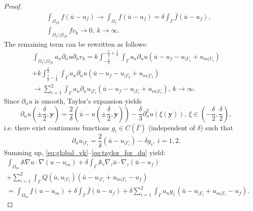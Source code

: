 \documentclass[a4paper]{article}
\def\vc#1{\mathbf{\boldsymbol{#1}}}     %
\def\tn#1{{\mathbb{#1}}}    %
\begin{document}
\begin{proof}
\begin{align}
&\int_{\Omega_{fk}} f (\bar u-u_f) \to \int_{\Omega_{f}} f (\bar u-u_f) = \delta\int_{\Gamma} \bar f (\bar u-u_f), \\
&\int_{\Omega_f\setminus\Omega_{fk}} f v_k \to 0,~k\to\infty.
\end{align}
The remaining term can be rewritten as follows:
\begin{multline}
\int_{\Omega_f\setminus\Omega_{fk}} a_n\partial_n u \partial_n v_k
= k\int_{-\frac\delta2}^{-\frac\delta2+\frac1k}\int_\Gamma a_n\partial_n u (\bar u - u_f - u_{|\Gamma_1} + u_{m|\Gamma_1})\\
+ k\int_{\frac\delta2-\frac1k}^{\frac\delta2}\int_\Gamma a_n\partial_n u (\bar u - u_f - u_{|\Gamma_2} + u_{m|\Gamma_2})\\
\to \sum_{i=1}^2\int_\Gamma a_n \partial_n u_{|\Gamma_i} (\bar u - u_f - u_{|\Gamma_i} + u_{m|\Gamma_i}),~k\to\infty.
\end{multline}
Since $\partial_n u$ is smooth, Taylor's expansion yields
\[ \partial_n u(\pm\frac\delta2,\vc y) = \frac2\delta(\bar u - u(\pm\frac\delta2,\vc y)) - \frac\delta3\partial_n^2 u(\xi(\vc y)),~\xi\in(-\frac\delta2,\frac\delta2), \]
i.e. there exist continuous functions $g_i\in C(\overline\Gamma)$ (independent of $\delta$) such that
\begin{equation}
\label{eq:taylor_for_du}
\partial_n u_{|\Gamma_i} = \frac2\delta(\bar u - u_{|\Gamma_i}) - \delta g_i,~i=1,2.
\end{equation}
Summing up, \eqref{eq:global_vk}--\eqref{eq:taylor_for_du} yield:
\begin{multline}
\label{eq:sum_global_vk_limit}
\int_{\Omega_m}\tn A\nabla u\cdot\nabla(u-u_m)
+\delta\int_\Gamma\tn A_\tau\nabla_\tau\bar u\cdot\nabla_\tau(\bar u-u_f)\\
+ \sum_{i=1}^2\int_\Gamma Q(\bar u,u_{|\Gamma_i}) (\bar u - u_{|\Gamma_i} + u_{m|\Gamma_i} - u_f)\\
= \int_{\Omega_m} f (u-u_m)
+ \delta\int_{\Gamma} \bar f (\bar u-u_f)
+ \delta\sum_{i=1}^2\int_\Gamma a_n g_i\, (\bar u - u_{|\Gamma_i} + u_{m|\Gamma_i} - u_f).
\end{multline}


\end{proof}
\end{document}
